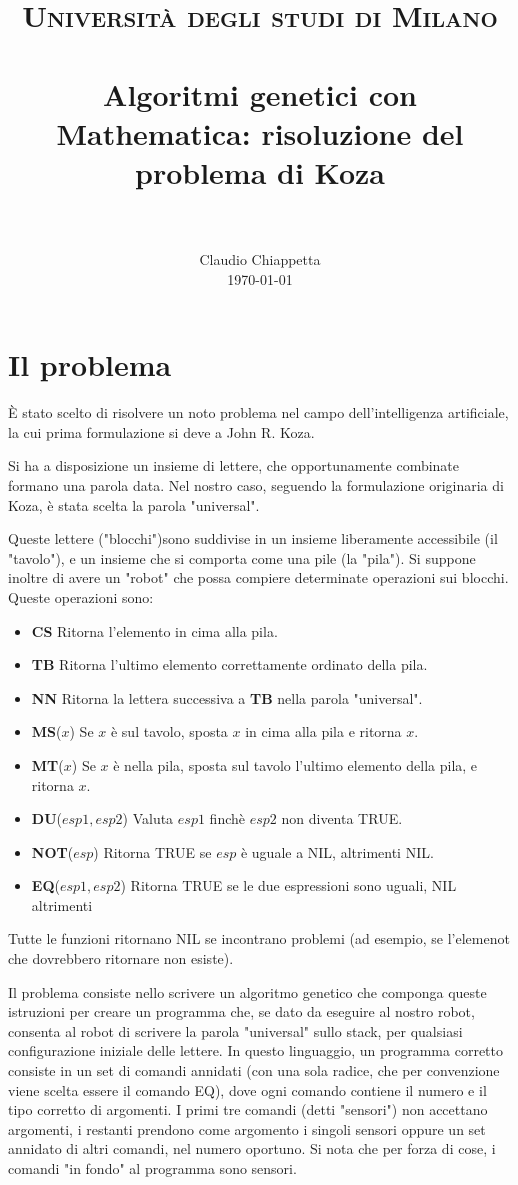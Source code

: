 \documentclass[paper=a4, fontsize=11pt]{scrartcl}
\title{
		\usefont{OT1}{bch}{b}{n}
		\normalfont \normalsize \textsc{Università degli studi di Milano} \\ [25pt]
		\horrule{0.5pt} \\[0.4cm]
		\huge Algoritmi genetici con Mathematica: risoluzione del problema di Koza \\
		\horrule{2pt} \\[0.5cm]
}
\author{
		\normalfont 								\normalsize
        Claudio Chiappetta\\[-3pt]		\normalsize
        \today
}
\date{}
\numberwithin{equation}{section}		%
\numberwithin{figure}{section}			%
\numberwithin{table}{section}				%
\begin{document}
\maketitle
\section{Il problema}
È stato scelto di risolvere un  noto problema nel campo dell'intelligenza artificiale, la cui prima formulazione si deve a John R. Koza.\cite{koza}


Si ha a disposizione un insieme di lettere, che opportunamente combinate formano una parola data. Nel nostro caso, seguendo la formulazione originaria di Koza, è stata scelta la parola "universal".

Queste lettere ("blocchi")sono suddivise in un insieme liberamente accessibile (il "tavolo"), e un insieme che si comporta come una pile (la "pila"). Si suppone inoltre di avere un "robot" che possa compiere determinate operazioni sui blocchi. Queste operazioni sono:
\begin{itemize}
\item {\textbf{ CS}} Ritorna l'elemento in cima alla pila.
\item {\textbf{ TB}} Ritorna l'ultimo elemento correttamente ordinato della pila.
\item {\textbf{ NN}} Ritorna la lettera successiva a \textbf{TB} nella parola "universal".
\item {\textbf{ MS}($x$)} Se $x$ è sul tavolo, sposta $x$ in cima alla pila e ritorna $x$.
\item {\textbf{ MT}($x$)} Se $x$ è nella pila, sposta sul tavolo l'ultimo elemento della pila, e ritorna $x$.
\item {\textbf{ DU}($esp1, esp2$)} Valuta $esp1$ finchè $esp2$ non diventa TRUE.
\item {\textbf{ NOT}($esp$)} Ritorna TRUE se $esp$ è uguale a NIL, altrimenti NIL.
\item {\textbf{ EQ}($esp1,esp2$)} Ritorna TRUE se le due espressioni sono uguali, NIL altrimenti
\end{itemize}

Tutte le funzioni ritornano NIL se incontrano problemi (ad esempio, se l'elemenot che dovrebbero ritornare non esiste).

Il problema consiste nello scrivere un algoritmo genetico che componga queste istruzioni per creare un programma che, se dato da eseguire al nostro robot, consenta al robot di scrivere la parola "universal" sullo stack, per qualsiasi configurazione iniziale delle lettere. In questo linguaggio, un programma corretto consiste in un set di comandi annidati (con una sola radice, che per convenzione viene scelta essere il comando EQ), dove ogni comando contiene il numero e il tipo corretto di argomenti. I primi tre comandi (detti "sensori") non accettano argomenti, i restanti prendono come argomento i singoli sensori oppure un set annidato di altri comandi, nel numero oportuno. 
Si nota che per forza di cose, i comandi "in fondo" al programma sono sensori.
\end{document}
